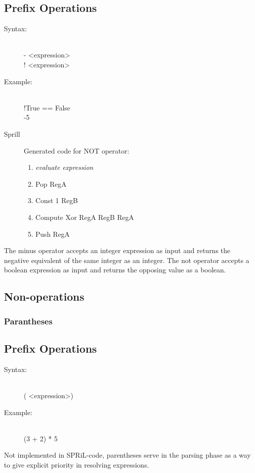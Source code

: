 \documentclass[10pt,a4paper]{report}
\begin{document}
\subsection{Prefix Operations}
\begin{description}
	\item[Syntax:] \hfill \\ 
		- \textless expression\textgreater \\
		! \textless expression\textgreater
	\item[Example:] \hfill \\
		!True == False \\
		-5
	\item[Sprill] Generated code for NOT operator:
		\begin{enumerate}
			\item \emph{evaluate expression}
			\item Pop RegA
			\item Const 1 RegB
			\item Compute Xor RegA RegB RegA
			\item Push RegA 
		\end{enumerate}
\end{description}
The minus operator accepts an integer expression as input and returns the negative equivalent of the same integer as an integer.
The not operator accepts a boolean expression as input and returns the opposing value as a boolean.

\subsection{Non-operations}
\subsubsection*{Parantheses}
\subsection{Prefix Operations}
\begin{description}
	\item[Syntax:] \hfill \\ 
		( \textless expression\textgreater )
	\item[Example:] \hfill \\
		(3 + 2) * 5 
\end{description}
Not implemented in SPRiL-code, parentheses serve in the parsing phase as a way to give explicit priority in resolving expressions.
\end{document}
